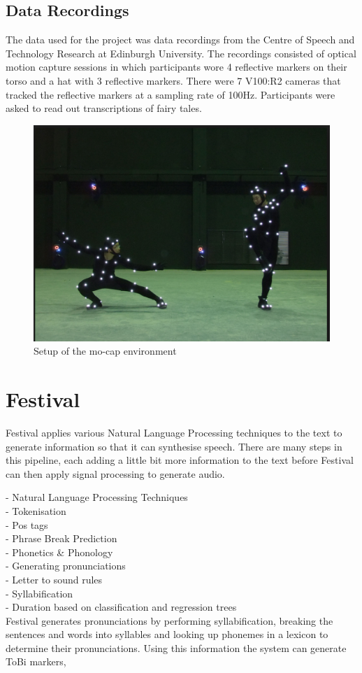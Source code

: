 \documentclass[bsc,frontabs,twoside,singlespacing,parskip]{infthesis}
\begin{document}
\subsection{Data Recordings}

The data used for the project was data recordings from the Centre of Speech and Technology Research at Edinburgh University. The recordings consisted of optical motion capture sessions in which participants wore 4 reflective markers on their torso and a hat with 3 reflective markers. There were 7 V100:R2 cameras that tracked the reflective markers at a sampling rate of 100Hz. Participants were asked to read out transcriptions of fairy tales.

\begin{figure}[h!]
	\centering
	\includegraphics[width=.5\textwidth]{mocap.png}
	\caption{Setup of the mo-cap environment}
\end{figure}

\section{Festival}

Festival applies various Natural Language Processing techniques to the text to generate information  so that it can synthesise speech.  There are many steps in this pipeline, each adding a little bit more information to the text before Festival can then apply signal processing to generate audio. 

- Natural Language Processing Techniques \\
- Tokenisation \\
- Pos tags \\
- Phrase Break Prediction \\
- Phonetics \& Phonology \\
- Generating pronunciations \\
- Letter to sound rules\\
- Syllabification\\
- Duration based on classification and regression trees \\
Festival generates pronunciations by performing syllabification, breaking the sentences and words into syllables and looking up phonemes in a lexicon to determine their pronunciations. Using this information the system can generate ToBi markers, 
\end{document}
